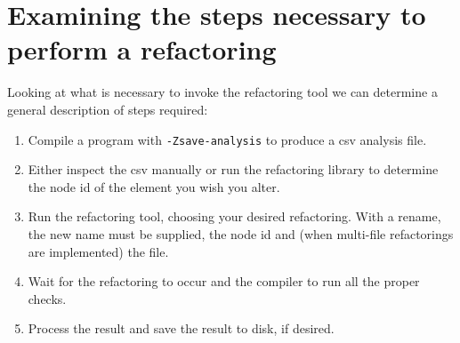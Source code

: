 









\section{Examining the steps necessary to perform a refactoring}

Looking at what is necessary to invoke the refactoring tool we can determine a general description of steps required:

\begin{enumerate}
\item Compile a program with {\verb|-Zsave-analysis|} to produce a csv analysis file.
\item Either inspect the csv manually or run the refactoring library to determine the node id of the element you wish you alter.
\item Run the refactoring tool, choosing your desired refactoring. With a rename, the new name must be supplied, the node id and (when multi-file refactorings are implemented) the file.
\item Wait for the refactoring to occur and the compiler to run all the proper checks. 
\item Process the result and save the result to disk, if desired.
\end{enumerate}


